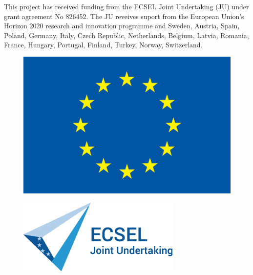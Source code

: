 This project has received funding from the ECSEL Joint Undertaking (JU) under grant agreement No 826452. 
The JU reveives suport from the European Union's Horizon 2020 research and innovation programme and Sweden, Austria, Spain, Poland, Germany, Italy, Czech Republic, Netherlands, Belgium, Latvia, Romania, France, Hungary, Portugal, Finland, Turkey, Norway, Switzerland.

\begin{figure}
    \centering
    \begin{minipage}{.5\textwidth}
      \centering
      \includegraphics[width=.9\linewidth]{Pictures/flag_yellow_high.jpg}
      \label{fig:test1}
    \end{minipage}%
    \begin{minipage}{.5\textwidth}
      \centering
      \includegraphics[width=.9\linewidth]{Pictures/logo_ECSEL-4_72dpi_RGB.jpg}
      \label{fig:test2}
    \end{minipage}
    \end{figure}